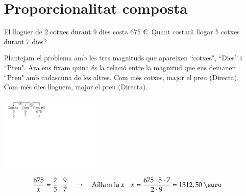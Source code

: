 \section{Proporcionalitat composta}


\begin{mylist}
	\exer El lloguer de 2 cotxes durant 9
dies costa 675 \euro{}. Quant costarà llogar 5 cotxes durant 7 dies?
\end{mylist}
	\vspace{-0.25cm}
	
\begin{example}
	\begin{minipage}{0.6\textwidth}
		Plantejam el problema amb les tres magnituds que apareixen ``cotxes", ``Dies'' i ``Preu". 
		Ara ens fixam quina és la relació entre la magnitud que ens demanen ``Preu" amb cadascuna de les altres.
		Com més cotxes, major el preu (Directa). Com més dies lloguem, major el preu (Directa).
		
	\end{minipage}
	\begin{minipage}{0.4\textwidth}
		\centering
		\includegraphics[width=5cm]{img-07/proporcionalitat}
	\end{minipage}
	
	\[ \frac{675}{x} = \frac{2}{5} \cdot \frac{9}{7} \quad \rightarrow \quad \text{Aïllam la }x \quad x=\frac{675\cdot 5 \cdot 7}{2\cdot 9}= 1312,50 \text{ \euro}  \]
\end{example}
 
